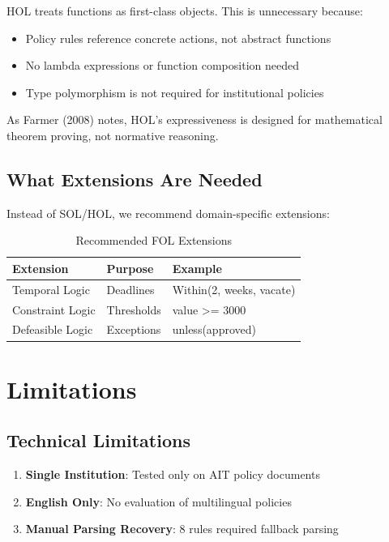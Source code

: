 HOL treats functions as first-class objects. This is unnecessary because:

\begin{itemize}
    \item Policy rules reference concrete actions, not abstract functions
    \item No lambda expressions or function composition needed
    \item Type polymorphism is not required for institutional policies
\end{itemize}

As Farmer (2008) notes, HOL's expressiveness is designed for mathematical theorem proving, not normative reasoning.

\subsection{What Extensions Are Needed}

Instead of SOL/HOL, we recommend domain-specific extensions:

\begin{table}[h]
\centering
\caption{Recommended FOL Extensions}
\label{tab:extensions}
\begin{tabular}{|l|l|l|}
\hline
\textbf{Extension} & \textbf{Purpose} & \textbf{Example} \\
\hline
Temporal Logic & Deadlines & Within(2, weeks, vacate) \\
Constraint Logic & Thresholds & value >= 3000 \\
Defeasible Logic & Exceptions & unless(approved) \\
\hline
\end{tabular}
\end{table}

\section{Limitations}

\subsection{Technical Limitations}

\begin{enumerate}
    \item \textbf{Single Institution}: Tested only on AIT policy documents
    \item \textbf{English Only}: No evaluation of multilingual policies
    \item \textbf{Manual Parsing Recovery}: 8 rules required fallback parsing
\end{enumerate}

